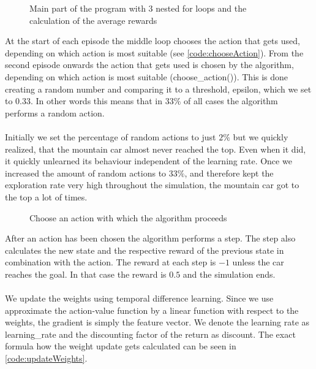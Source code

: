 \documentclass{article}
\begin{document}
	\begin{figure}[h]
		\caption{Main part of the program with 3 nested for loops and the calculation of the average rewards}
		\label{code:loops}
		
	\end{figure}
	
	\FloatBarrier
	
	\noindent At the start of each episode the middle loop chooses the action that gets used, depending on which action is most suitable (see \autoref{code:chooseAction}). From the second episode onwards the action that gets used is chosen by the algorithm, depending on which action is most suitable (choose\_action()). This is done creating a random number and comparing it to a threshold, epsilon, which we set to $0.33$. In other words this means that in $33\%$ of all cases the algorithm performs a random action. \\
	\\
	Initially we set the percentage of random actions to just $2\%$ but we quickly realized, that the mountain car almost never reached the top. Even when it did, it quickly unlearned its behaviour independent of the learning rate.  Once we increased the amount of random actions to $33\%$, and therefore kept the exploration rate very high throughout the simulation, the mountain car got to the top a lot of times.
	
	
	\begin{figure}
		\caption{Choose an action with which the algorithm proceeds}
		\label{code:chooseAction}
		
	\end{figure}
	\newpage
	
	\noindent After an action has been chosen the algorithm performs a step. The step also calculates the new state and the respective reward of the previous state in combination with the action. The reward at each step is $-1$ unless the car reaches the goal. In that case the reward is $0.5$ and the simulation ends. \\
	\\
	We update the weights using temporal difference learning. Since we use approximate the action-value function by a linear function with respect to the weights, the gradient is simply the feature vector. We denote the learning rate as learning\_rate and the discounting factor of the return as discount. 
	The exact formula how the weight update gets calculated can be seen in \autoref{code:updateWeights}.
	
\end{document}
